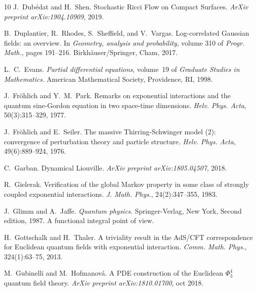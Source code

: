 \documentclass[a4paper,10pt]{article}
\newcommand{\tmtextit}[1]{{\itshape{#1}}}
\newcommand{\tmtextrm}[1]{{\rmfamily{#1}}}
\begin{document}
\begin{thebibliography}{10}
  J.~Dub{\'e}dat  and  H.~Shen. {\newblock}Stochastic
  Ricci Flow on Compact Surfaces. {\newblock}\tmtextit{ArXiv preprint
  arXiv:1904.10909}, 2019.{\newblock}
  
  B.~Duplantier, R.~Rhodes, S.~Sheffield, and  V.~Vargas.
  {\newblock}Log-correlated Gaussian fields: an overview. {\newblock}In
  \tmtextit{Geometry, analysis and probability},  volume  310  of
  \tmtextit{Progr. Math.},  pages  191--216. Birkh{\"a}user/Springer, Cham,
  2017.{\newblock}
  
  L.~C.~Evans. {\newblock}\tmtextit{Partial
  differential equations},  volume~19  of \tmtextit{Graduate Studies in
  Mathematics}. {\newblock}American Mathematical Society, Providence, RI,
  1998.{\newblock}
  
  J.~Fr{\"o}hlich  and  Y.~M.~Park. {\newblock}Remarks on
  exponential interactions and the quantum sine-Gordon equation in two
  space-time dimensions. {\newblock}\tmtextit{Helv. Phys. Acta},
  50(3):315--329, 1977.{\newblock}
  
  J.~Fr{\"o}hlich  and  E.~Seiler. {\newblock}The massive
  Thirring-Schwinger model (\tmtextrm{qed}2): convergence of perturbation
  theory and particle structure. {\newblock}\tmtextit{Helv. Phys. Acta},
  49(6):889--924, 1976.{\newblock}
  
  C.~Garban. {\newblock}Dynamical Liouville.
  {\newblock}\tmtextit{ArXiv preprint arXiv:1805.04507}, 2018.{\newblock}
  
  R.~Gielerak. {\newblock}Verification of the global Markov
  property in some class of strongly coupled exponential interactions.
  {\newblock}\tmtextit{J. Math. Phys.}, 24(2):347--355, 1983.{\newblock}
  
  J.~Glimm  and  A.~Jaffe. {\newblock}\tmtextit{Quantum
  physics}. {\newblock}Springer-Verlag, New York, Second  edition, 1987.
  {\newblock}A functional integral point of view.{\newblock}
  
  H.~Gottschalk  and  H.~Thaler. {\newblock}A
  triviality result in the AdS/CFT correspondence for Euclidean quantum fields
  with exponential interaction. {\newblock}\tmtextit{Comm. Math. Phys.},
  324(1):63--75, 2013.{\newblock}
  
  M.~Gubinelli  and  M.~Hofmanov{\'a}.
  {\newblock}A PDE construction of the Euclidean $\Phi^4_3$ quantum field
  theory. {\newblock}\tmtextit{ArXiv preprint arXiv:1810.01700}, oct
  2018.{\newblock}
  

\end{thebibliography}
\end{document}
